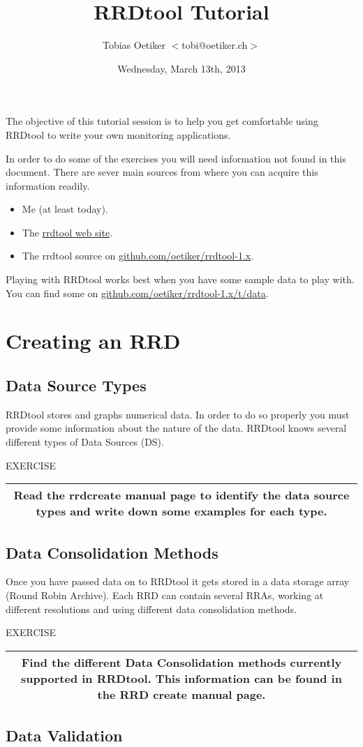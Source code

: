 \documentclass[a4paper,12pt]{article}
\title{RRDtool Tutorial}
\date{Wednesday, March 13th, 2013}
\author{Tobias Oetiker $<$tobi@oetiker.ch$>$}
\newenvironment{work}{\textsf{\tiny EXERCISE}\nopagebreak\\[0.3ex]\begin{tabular}{|c|}
 \hline
 \begin{minipage}{0.965\linewidth}%
 \setlength{\parskip}{1.6ex plus 0.6ex minus 0.4ex}%
 \rule{0pt}{2.8ex}\ignorespaces}
{\rule[-1.8ex]{0pt}{0pt}\end{minipage}\\
 \hline
 \end{tabular}}
\newcommand{\ex}[1]{\subsection{#1}}
\begin{document}
\maketitle

The objective of this tutorial session is to help you get comfortable using
RRDtool to write your own monitoring applications.

In order to do some of the exercises you will need information not found in this document.
There are sever main sources from where you can
acquire this information readily.

\begin{itemize}
\item Me (at least today).
\item The \href{http://oss.oetiker.ch/rrdtool}{rrdtool web site}.
\item The rrdtool source on \url{github.com/oetiker/rrdtool-1.x}.
\end{itemize}

Playing with RRDtool works best when you have some sample data to play with.
You can find some on \url{github.com/oetiker/rrdtool-1.x/t/data}.

\newpage
\section{Creating an RRD}
\ex{Data Source Types}

RRDtool stores and graphs numerical data. In order to do so
properly you must provide some information about the nature of the
data. RRDtool knows several different types of Data Sources (DS).

\begin{work}
  Read the rrdcreate manual page to identify the data source types
  and write down some examples for each type.
\end{work}

\ex{Data Consolidation Methods}

Once you have passed data on to RRDtool it gets stored in a data
storage array (Round Robin Archive). Each RRD can contain several
RRAs, working at different resolutions and using different data
consolidation methods.

\begin{work}
  Find the different Data Consolidation methods currently supported in
  RRDtool. This information can be found in the RRD create manual
  page.
\end{work}

\ex{Data Validation}
\end{document}
